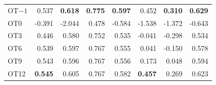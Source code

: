 {\begin{longtable}{@{}lrrrrrrr@{}}
OT$-1$ & \phantom{-}0.537 & \textbf{\phantom{-}0.618} & \textbf{\phantom{-}0.775} & \textbf{\phantom{-}0.597} & \phantom{-}0.452 & \textbf{\phantom{-}0.310} & \textbf{\phantom{-}0.629} \\
OT0 & -0.391 & -2.044 & \phantom{-}0.478 & -0.584 & -1.538 & -1.372 & -0.643 \\
OT3 & \phantom{-}0.446 & \phantom{-}0.580 & \phantom{-}0.752 & \phantom{-}0.535 & -0.041 & -0.298 & \phantom{-}0.534 \\
OT6 & \phantom{-}0.539 & \phantom{-}0.597 & \phantom{-}0.767 & \phantom{-}0.555 & \phantom{-}0.041 & -0.150 & \phantom{-}0.578 \\
OT9 & \phantom{-}0.543 & \phantom{-}0.596 & \phantom{-}0.767 & \phantom{-}0.556 & \phantom{-}0.173 & \phantom{-}0.048 & \phantom{-}0.594 \\
OT12 & \textbf{\phantom{-}0.545} & \phantom{-}0.605 & \phantom{-}0.767 & \phantom{-}0.582 & \textbf{\phantom{-}0.457} & \phantom{-}0.269 & \phantom{-}0.623 \\
\end{longtable}
}


